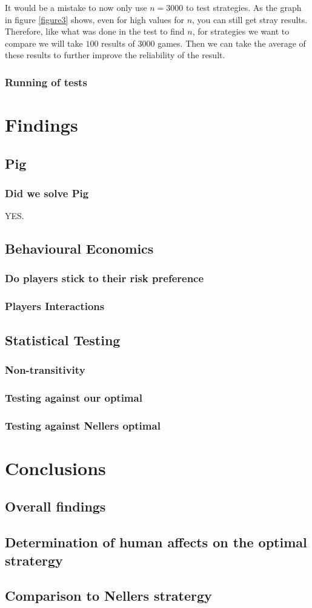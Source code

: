 \documentclass[a4paper,titlepage]{article}
\begin{document}
It would be a mistake to now only use $n=3000$ to test strategies. As the graph in figure \ref{figure3} shows, even for high values for $n$, you can still get stray results. Therefore, like what was done in the test to find $n$, for strategies we want to compare we will take $100$ results of $3000$ games. Then we can take the average of these results to further improve the reliability of the result.
\subsubsection{Running of tests}


\section{Findings}
\subsection{Pig}
\subsubsection{Did we solve Pig}
{\tiny YES.}

\subsection{Behavioural Economics}
\subsubsection{Do players stick to their risk preference}
\subsubsection{Players Interactions}

\subsection{Statistical Testing}
\subsubsection{Non-transitivity}
\subsubsection{Testing against our optimal}
\subsubsection{Testing against Nellers optimal}


\section{Conclusions}
\subsection{Overall findings}
\subsection{Determination of human affects on the optimal stratergy}
\subsection{Comparison to Nellers stratergy}

\nocite{*}


\end{document}
